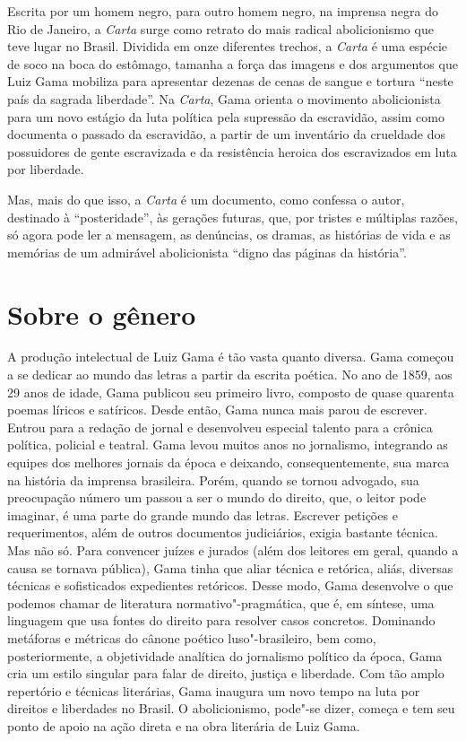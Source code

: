 Escrita por um homem negro, para outro homem negro, na imprensa negra do
Rio de Janeiro, a \emph{Carta} surge como retrato do mais radical
abolicionismo que teve lugar no Brasil. Dividida em onze diferentes
trechos, a \emph{Carta} é uma espécie de soco na boca do estômago,
tamanha a força das imagens e dos argumentos que Luiz Gama mobiliza para
apresentar dezenas de cenas de sangue e tortura ``neste país da sagrada
liberdade''. Na \emph{Carta}, Gama orienta o movimento abolicionista
para um novo estágio da luta política pela supressão da escravidão,
assim como documenta o passado da escravidão, a partir de um inventário
da crueldade dos possuidores de gente escravizada e da resistência
heroica dos escravizados em luta por liberdade.

Mas, mais do que isso, a \emph{Carta} é um documento, como confessa o
autor, destinado à ``posteridade'', às gerações futuras, que, por
tristes e múltiplas razões, só agora pode ler a mensagem, as denúncias,
os dramas, as histórias de vida e as memórias de um admirável
abolicionista ``digno das páginas da história''.

\section{Sobre o gênero}

A produção intelectual de Luiz Gama é tão vasta quanto diversa. Gama
começou a se dedicar ao mundo das letras a partir da escrita poética. No
ano de 1859, aos 29 anos de idade, Gama publicou seu primeiro livro,
composto de quase quarenta poemas líricos e satíricos. Desde então, Gama
nunca mais parou de escrever. Entrou para a redação de jornal e
desenvolveu especial talento para a crônica política, policial e
teatral. Gama levou muitos anos no jornalismo, integrando as equipes dos
melhores jornais da época e deixando, consequentemente, sua marca na
história da imprensa brasileira. Porém, quando se tornou advogado, sua
preocupação número um passou a ser o mundo do direito, que, o leitor
pode imaginar, é uma parte do grande mundo das letras. Escrever petições
e requerimentos, além de outros documentos judiciários, exigia bastante
técnica. Mas não só. Para convencer juízes e jurados (além dos leitores
em geral, quando a causa se tornava pública), Gama tinha que aliar
técnica e retórica, aliás, diversas técnicas e sofisticados expedientes
retóricos. Desse modo, Gama desenvolve o que podemos chamar de
literatura normativo"-pragmática, que é, em síntese, uma linguagem que
usa fontes do direito para resolver casos concretos. Dominando metáforas
e métricas do cânone poético luso"-brasileiro, bem como, posteriormente,
a objetividade analítica do jornalismo político da época, Gama cria um
estilo singular para falar de direito, justiça e liberdade. Com tão
amplo repertório e técnicas literárias, Gama inaugura um novo tempo na
luta por direitos e liberdades no Brasil. O abolicionismo, pode"-se
dizer, começa e tem seu ponto de apoio na ação direta e na obra
literária de Luiz Gama.

